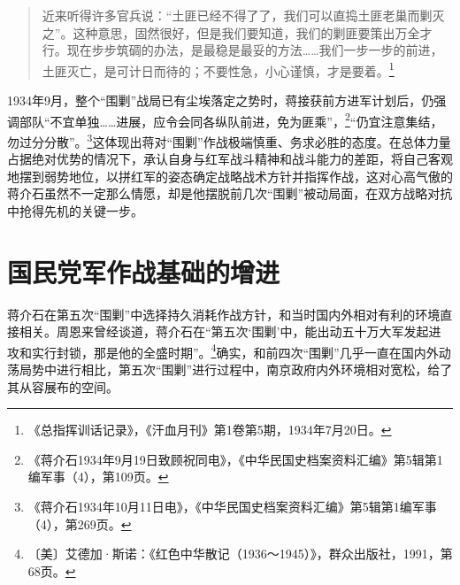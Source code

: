\begin{quote}

近来听得许多官兵说：“土匪已经不得了了，我们可以直捣土匪老巢而剿灭之”。这种意思，固然很好，但是我们要知道，我们的剿匪要策出万全才行。现在步步筑碉的办法，是最稳是最妥的方法……我们一步一步的前进，土匪灭亡，是可计日而待的；不要性急，小心谨慎，才是要着。\footnote{《总指挥训话记录》，《汗血月刊》第1卷第5期，1934年7月20日。}
\end{quote}


1934年9月，整个“围剿”战局已有尘埃落定之势时，蒋接获前方进军计划后，仍强调部队“不宜单独……进展，应令会同各纵队前进，免为匪乘”，\footnote{《蒋介石1934年9月19日致顾祝同电》，《中华民国史档案资料汇编》第5辑第1编军事（4），第109页。}“仍宜注意集结，勿过分分散”。\footnote{《蒋介石1934年10月11日电》，《中华民国史档案资料汇编》第5辑第1编军事（4），第269页。}这体现出蒋对“围剿”作战极端慎重、务求必胜的态度。在总体力量占据绝对优势的情况下，承认自身与红军战斗精神和战斗能力的差距，将自己客观地摆到弱势地位，以拼红军的姿态确定战略战术方针并指挥作战，这对心高气傲的蒋介石虽然不一定那么情愿，却是他摆脱前几次“围剿”被动局面，在双方战略对抗中抢得先机的关键一步。

\section{国民党军作战基础的增进}


蒋介石在第五次“围剿”中选择持久消耗作战方针，和当时国内外相对有利的环境直接相关。周恩来曾经谈道，蒋介石在“第五次‘围剿’中，能出动五十万大军发起进攻和实行封锁，那是他的全盛时期”。\footnote{〔美〕艾德加·斯诺：《红色中华散记（1936～1945）》，群众出版社，1991，第68页。}确实，和前四次“围剿”几乎一直在国内外动荡局势中进行相比，第五次“围剿”进行过程中，南京政府内外环境相对宽松，给了其从容展布的空间。


